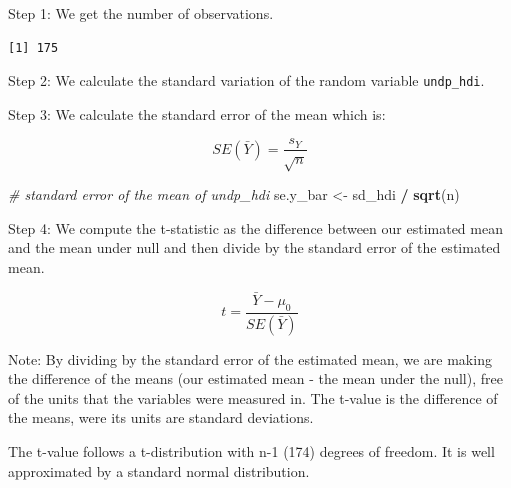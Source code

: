 \documentclass[]{article}
\newenvironment{Shaded}{\begin{snugshade}}{\end{snugshade}}
\newcommand{\KeywordTok}[1]{\textcolor[rgb]{0.13,0.29,0.53}{\textbf{#1}}}
\newcommand{\StringTok}[1]{\textcolor[rgb]{0.31,0.60,0.02}{#1}}
\newcommand{\CommentTok}[1]{\textcolor[rgb]{0.56,0.35,0.01}{\textit{#1}}}
\newcommand{\OperatorTok}[1]{\textcolor[rgb]{0.81,0.36,0.00}{\textbf{#1}}}
\newcommand{\NormalTok}[1]{#1}
\theoremstyle{definition}
\theoremstyle{definition}
\theoremstyle{definition}
\theoremstyle{remark}
\begin{document}
Step 1: We get the number of observations.

\begin{Shaded}
\end{Shaded}

\begin{verbatim}
[1] 175
\end{verbatim}

Step 2: We calculate the standard variation of the random variable
\texttt{undp\_hdi}.

\begin{Shaded}
\end{Shaded}

Step 3: We calculate the standard error of the mean which is:

\[ SE({\bar{Y}}) = \frac{ s_{Y}}  { \sqrt{n}} \]

\begin{Shaded}
\begin{Highlighting}[]
\CommentTok{# standard error of the mean of undp_hdi}
\NormalTok{se.y_bar <-}\StringTok{ }\NormalTok{sd_hdi }\OperatorTok{/}\StringTok{ }\KeywordTok{sqrt}\NormalTok{(n)}
\end{Highlighting}
\end{Shaded}

Step 4: We compute the t-statistic as the difference between our
estimated mean and the mean under null and then divide by the standard
error of the estimated mean.

\[ t = \frac{ \bar{Y} - \mu_{0}}  { SE({\bar{Y}}) } \]

Note: By dividing by the standard error of the estimated mean, we are
making the difference of the means (our estimated mean - the mean under
the null), free of the units that the variables were measured in. The
t-value is the difference of the means, were its units are standard
deviations.

The t-value follows a t-distribution with n-1 (174) degrees of freedom.
It is well approximated by a standard normal distribution.
\end{document}
